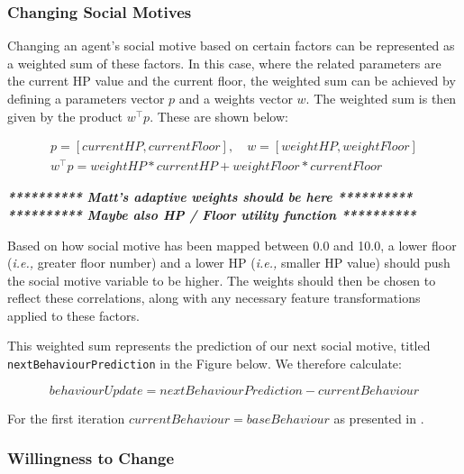 \subsubsection{Changing Social Motives}

Changing an agent's social motive based on certain factors can be represented as a weighted sum of these factors. In this case, where the related parameters are the current HP value and the current floor, the weighted sum can be achieved by defining a parameters vector $p$ and a weights vector $w$. The weighted sum is then given by the product $w^\top{}p$. These are shown below:


\begin{equation}
    \begin{gathered}
    p = [currentHP, currentFloor],\quad w=[weightHP, weightFloor] \\ 
    w^\top{}p = weightHP*currentHP + weightFloor*currentFloor
    \end{gathered}
\end{equation}





\begin{center}
    \textit{\textbf{********** Matt's adaptive weights should be here **********}} \\
    \textit{\textbf{********** Maybe also HP / Floor utility function **********}}
\end{center}
Based on how social motive has been mapped between 0.0 and 10.0, a lower floor (\emph{i.e.,} greater floor number) and a lower HP (\emph{i.e.,} smaller HP value) should push the social motive variable to be higher. The weights should then be chosen to reflect these correlations, along with any necessary feature transformations applied to these factors.



This weighted sum represents the prediction of our next social motive, titled \texttt{nextBehaviourPrediction} in the Figure below. We therefore calculate:

\begin{equation}
    behaviourUpdate = nextBehaviourPrediction - currentBehaviour
\end{equation}


For the first iteration $currentBehaviour=baseBehaviour$ as presented in .

\subsubsection{Willingness to Change}

